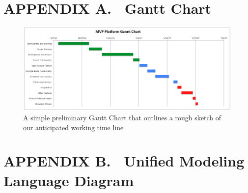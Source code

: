 \documentclass[onecolumn, draftclsnofoot,10pt, compsoc]{IEEEtran}
\begin{document}
{


\clearpage
\section[APPENDIX A. \ Gantt Chart]{
APPENDIX A. \ Gantt Chart}

\bigskip


\begin{figure}[ht!]
\centering
\includegraphics[width=160mm]{gantt_chart.png}
\caption{A simple preliminary Gantt Chart that outlines a rough sketch of our anticipated working time line}
\end{figure}

\clearpage
\section[APPENDIX B. \ UML Diagram]{
APPENDIX B. \ Unified Modeling Language Diagram}

}
\end{document}
